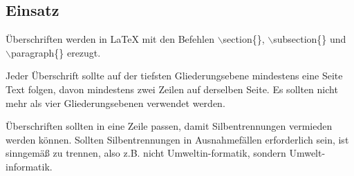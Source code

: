 \subsection{Einsatz}
Überschriften werden in \LaTeX{} mit den Befehlen $\backslash$section\{\}, $\backslash$subsection\{\} und $\backslash$paragraph\{\} erezugt.

Jeder Überschrift sollte auf der tiefsten Gliederungsebene mindestens eine Seite Text folgen, davon mindestens zwei Zeilen auf derselben Seite. Es sollten nicht mehr als vier Gliederungsebenen verwendet werden.

Überschriften sollten in eine Zeile passen, damit Silbentrennungen vermieden werden können. Sollten Silbentrennungen in Ausnahmefällen erforderlich sein, ist sinngemäß zu trennen, also z.B. nicht Umweltin-formatik, sondern Umwelt-informatik.
